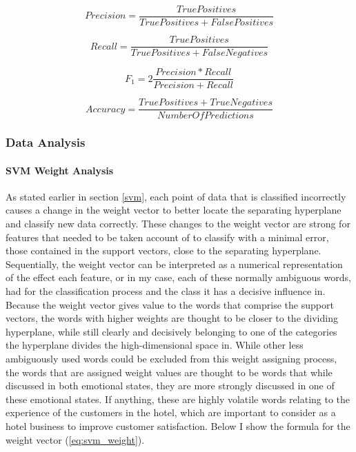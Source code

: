 \documentclass[review]{elsarticle}
\newcommand{\myparagraph}[1]{\paragraph{#1}\mbox{}\smallskip}
\begin{document}
\begin{equation}\label{eq:precision}
Precision = \frac{True Positives}{True Positives + False Positives}
\end{equation}

\begin{equation}\label{eq:recall}
Recall = \frac{True Positives}{True Positives + False Negatives}
\end{equation}

\begin{equation}\label{eq:f1}
F_{1} = 2  \frac{Precision * Recall}{Precision + Recall}
\end{equation}

\begin{equation}\label{eq:accuracy}
Accuracy = \frac{True Positives + True Negatives}{Number Of Predictions}
\end{equation}

\subsubsection{Data Analysis}\label{dataanalysis}

\myparagraph{SVM Weight Analysis}\label{svmweightsanalysis} 

As stated earlier in section \ref{svm}, each point of data that is classified incorrectly causes a change in the weight vector to better locate the separating hyperplane and classify new data correctly. These changes to the weight vector are strong for features that needed to be taken account of to classify with a minimal error, those contained in the support vectors, close to the separating hyperplane. Sequentially, the weight vector can be interpreted as a numerical representation of the effect each feature, or in my case, each of these normally ambiguous words, had for the classification process and the class it has a decisive influence in. Because the weight vector gives value to the words that comprise the support vectors, the words with higher weights are thought to be closer to the dividing hyperplane, while still clearly and decisively belonging to one of the categories the hyperplane divides the high-dimensional space in. While other less ambiguously used words could be excluded from this weight assigning process, the words that are assigned weight values are thought to be words that while discussed in both emotional states, they are more strongly discussed in one of these emotional states. If anything, these are highly volatile words relating to the experience of the customers in the hotel, which are important to consider as a hotel business to improve customer satisfaction. Below I show the formula for the weight vector (\ref{eq:svm_weight}).
\end{document}
